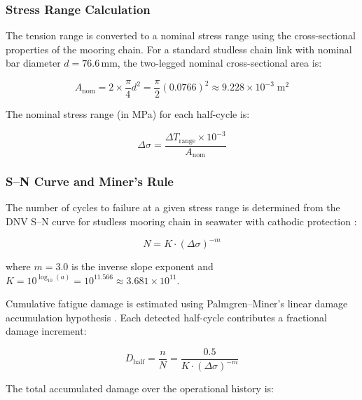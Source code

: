 \documentclass[preprint,12pt]{elsarticle}
\begin{document}
\subsubsection{Stress Range Calculation}

The tension range is converted to a nominal stress range using the cross-sectional properties of the mooring chain. For a standard studless chain link with nominal bar diameter $d = 76.6$\,mm, the two-legged nominal cross-sectional area is:

\begin{equation}
\label{eq:area}
    A_{\text{nom}} = 2 \times \frac{\pi}{4} d^2 = \frac{\pi}{2} (0.0766)^2 \approx 9.228 \times 10^{-3}\;\text{m}^2
\end{equation}

\noindent The nominal stress range (in MPa) for each half-cycle is:

\begin{equation}
\label{eq:stress_range}
    \Delta\sigma = \frac{\Delta T_{\text{range}} \times 10^{-3}}{A_{\text{nom}}}
\end{equation}

\subsubsection{S--N Curve and Miner's Rule}

The number of cycles to failure at a given stress range is determined from the DNV S--N curve for studless mooring chain in seawater with cathodic protection \cite{dnvrp2014}:

\begin{equation}
\label{eq:sn_curve}
    N = K \cdot (\Delta\sigma)^{-m}
\end{equation}

\noindent where $m = 3.0$ is the inverse slope exponent and $K = 10^{\log_{10}(a)} = 10^{11.566} \approx 3.681 \times 10^{11}$.

Cumulative fatigue damage is estimated using Palmgren--Miner's linear damage accumulation hypothesis \cite{miner1945cumulative}. Each detected half-cycle contributes a fractional damage increment:

\begin{equation}
\label{eq:miner}
    D_{\text{half}} = \frac{n}{N} = \frac{0.5}{K \cdot (\Delta\sigma)^{-m}}
\end{equation}

\noindent The total accumulated damage over the operational history is:
\end{document}

